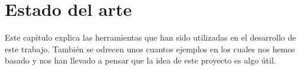 %
%
%
%
%
%
%
%
%
%

\chapter{Estado del arte}
\label{cap2}

\begin{FraseCelebre}
\begin{Frase}
\end{Frase}
\begin{Fuente}
\end{Fuente}
\end{FraseCelebre}

\begin{resumen}
 Este cap\'itulo explica las herramientas que han sido utilizadas en el desarrollo de este trabajo. Tambi\'en se odrecen unos cuantos ejemplos en los cuales nos hemos basado y nos han llevado a pensar que la idea de este proyecto es algo \'util.
\end{resumen}

